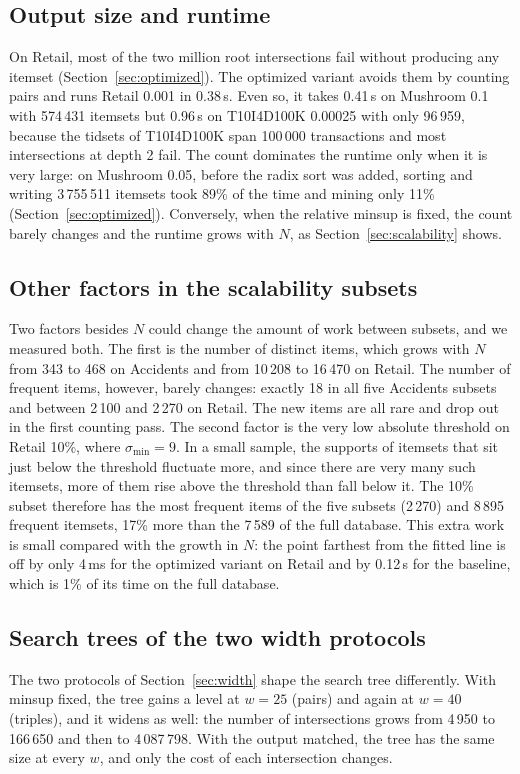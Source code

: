 \subsection{Output size and runtime}
\label{app:count-runtime}
On Retail, most of the two million root intersections fail without producing any itemset
(Section~\ref{sec:optimized}). The optimized variant avoids them by counting pairs and
runs Retail 0.001 in 0.38\,s. Even so, it takes 0.41\,s on Mushroom 0.1 with
574\,431 itemsets but 0.96\,s on T10I4D100K 0.00025 with only 96\,959, because the
tidsets of T10I4D100K span 100\,000 transactions and most intersections at depth 2 fail.
The count dominates the runtime only when it is very large: on Mushroom 0.05, before the
radix sort was added, sorting and writing 3\,755\,511 itemsets took 89\% of the time and
mining only 11\% (Section~\ref{sec:optimized}). Conversely, when the relative minsup is
fixed, the count barely changes and the runtime grows with $N$, as
Section~\ref{sec:scalability} shows.

\subsection{Other factors in the scalability subsets}
\label{app:scal-factors}
Two factors besides $N$ could change the amount of work between subsets, and we measured
both. The first is the number of distinct items, which grows with $N$ from 343 to 468 on
Accidents and from 10\,208 to 16\,470 on Retail. The number of frequent items, however,
barely changes: exactly 18 in all five Accidents subsets and between 2\,100 and 2\,270 on
Retail. The new items are all rare and drop out in the first counting pass. The second
factor is the very low absolute threshold on Retail 10\%, where $\sigma_{\min} = 9$. In a
small sample, the supports of itemsets that sit just below the threshold fluctuate more,
and since there are very many such itemsets, more of them rise above the threshold than
fall below it. The 10\% subset therefore has the most frequent items of the five subsets
(2\,270) and 8\,895 frequent itemsets, 17\% more than the 7\,589 of the full database.
This extra work is small compared with the growth in $N$: the point farthest from the
fitted line is off by only 4\,ms for the optimized variant on Retail and by 0.12\,s for
the baseline, which is 1\% of its time on the full database.

\subsection{Search trees of the two width protocols}
\label{app:width-tree}
The two protocols of Section~\ref{sec:width} shape the search tree differently. With
minsup fixed, the tree gains a level at $w = 25$ (pairs) and again at $w = 40$ (triples),
and it widens as well: the number of intersections grows from 4\,950 to 166\,650 and then
to 4\,087\,798. With the output matched, the tree has the same size at every $w$, and only
the cost of each intersection changes.

